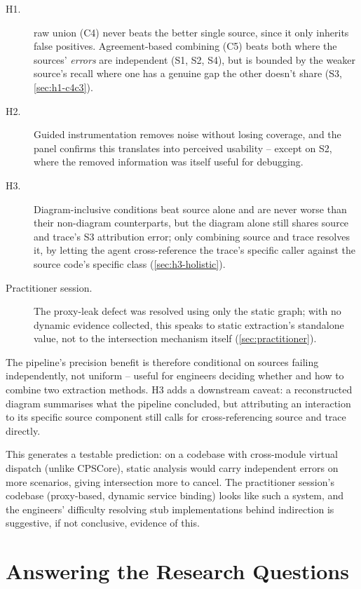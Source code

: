 \begin{description}
  \item[H1.] raw union (C4) never beats the better single source,
    since it only inherits false positives. Agreement-based combining
    (C5) beats both where the sources' \emph{errors} are independent
    (S1, S2, S4), but is bounded by the weaker source's recall where
    one has a genuine gap the other doesn't share (S3,
    \cref{sec:h1-c4c3}).
  \item[H2.] Guided instrumentation removes noise without losing
    coverage, and the panel confirms this translates into perceived
    usability -- except on S2, where the removed information was itself
    useful for debugging.
  \item[H3.] Diagram-inclusive conditions beat source alone and are
    never worse than their non-diagram counterparts, but the diagram
    alone still shares source and trace's S3 attribution error; only
    combining source and trace resolves it, by letting the agent
    cross-reference the trace's specific caller against the source
    code's specific class (\cref{sec:h3-holistic}).
  \item[Practitioner session.] The proxy-leak defect was resolved using
    only the static graph; with no dynamic evidence collected, this
    speaks to static extraction's standalone value, not to the
    intersection mechanism itself (\cref{sec:practitioner}).
\end{description}

The pipeline's precision benefit is therefore conditional on sources
failing independently, not uniform -- useful for engineers deciding
whether and how to combine two extraction methods. H3 adds a downstream
caveat: a reconstructed diagram summarises what the pipeline concluded,
but attributing an interaction to its specific source component still
calls for cross-referencing source and trace directly.

This generates a testable prediction: on a codebase with cross-module
virtual dispatch (unlike CPSCore), static analysis would carry
independent errors on more scenarios, giving intersection more to
cancel. The practitioner session's codebase (proxy-based, dynamic
service binding) looks like such a system, and the engineers' difficulty
resolving stub implementations behind indirection is suggestive, if not
conclusive, evidence of this.

\section{Answering the Research Questions}\label{sec:rq-answers}


